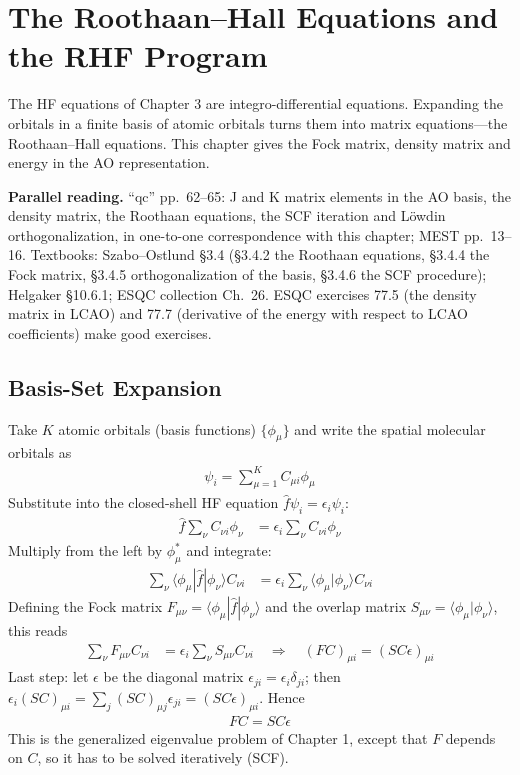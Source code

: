 \chapter{The Roothaan--Hall Equations and the RHF Program}
\label{ch:roothaan}

The HF equations of Chapter 3 are integro-differential equations. Expanding the orbitals in a finite basis of atomic orbitals turns them into matrix equations---the Roothaan--Hall equations. This chapter gives the Fock matrix, density matrix and energy in the AO representation.

\textbf{Parallel reading.} “qc” pp.~62--65: J and K matrix elements in the AO basis, the density matrix, the Roothaan equations, the SCF iteration and Löwdin orthogonalization, in one-to-one correspondence with this chapter; MEST pp.~13--16. Textbooks: Szabo--Ostlund §3.4 (§3.4.2 the Roothaan equations, §3.4.4 the Fock matrix, §3.4.5 orthogonalization of the basis, §3.4.6 the SCF procedure); Helgaker §10.6.1; ESQC collection Ch.~26. ESQC exercises 77.5 (the density matrix in LCAO) and 77.7 (derivative of the energy with respect to LCAO coefficients) make good exercises.

\section{Basis-Set Expansion}

Take $K$ atomic orbitals (basis functions) $\{\phi_\mu\}$ and write the spatial molecular orbitals as
\begin{align*}
\psi_i = \sum_{\mu=1}^K C_{\mu i} \phi_\mu
\end{align*}
Substitute into the closed-shell HF equation $\hat{f} \psi_i = \epsilon_i \psi_i$:
\begin{align*}
\hat{f} \sum_{\nu} C_{\nu i} \phi_\nu &= \epsilon_i \sum_{\nu} C_{\nu i} \phi_\nu
\end{align*}
Multiply from the left by $\phi_\mu^*$ and integrate:
\begin{align*}
\sum_{\nu} \langle \phi_\mu|\hat{f}|\phi_\nu\rangle C_{\nu i} &= \epsilon_i \sum_{\nu} \langle \phi_\mu|\phi_\nu\rangle C_{\nu i}
\end{align*}
Defining the Fock matrix $F_{\mu \nu} = \langle \phi_\mu|\hat{f}|\phi_\nu\rangle$ and the overlap matrix $S_{\mu \nu} = \langle \phi_\mu|\phi_\nu\rangle$, this reads
\begin{align*}
\sum_{\nu} F_{\mu \nu} C_{\nu i} &= \epsilon_i \sum_{\nu} S_{\mu \nu} C_{\nu i} \quad \Rightarrow \quad (F C)_{\mu i} = (S C \epsilon)_{\mu i}
\end{align*}
Last step: let $\epsilon$ be the diagonal matrix $\epsilon_{ji} = \epsilon_i \delta_{ji}$; then $\epsilon_i (S C)_{\mu i} = \sum_j (S C)_{\mu j} \epsilon_{ji} = (S C \epsilon)_{\mu i}$. Hence
\begin{align}\label{eq:roothaan}
F C = S C \epsilon
\end{align}
This is the generalized eigenvalue problem of Chapter 1, except that $F$ depends on $C$, so it has to be solved iteratively (SCF).

